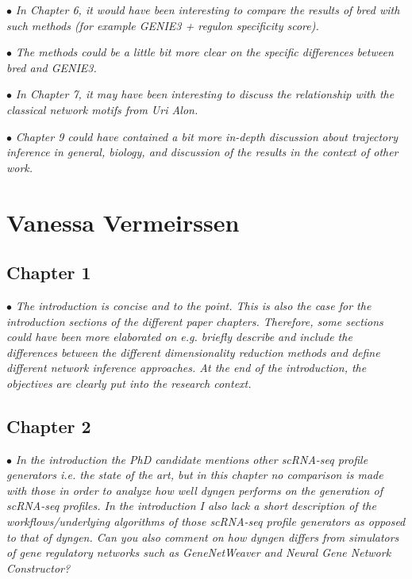 \documentclass[10pt]{article}
\newcommand{\exam}[2][\  ]{\hspace{0pt}\marginpar{\color{red}#1}$\bullet$ \textit{#2}}
\newcommand{\imp}[1]{{\color{red} #1}}
\newcommand{\nimp}[1]{{\color{gray} #1}}
\newcommand{\bigexclaim}{\raisebox{-0.1em}{\BigTriangleUp}\hspace{-0.32em}\llap{\small\textbf{!}}\hspace{0.32em}}
\newcommand{\tagimp}{\bigexclaim}
\newcommand{\tagtime}{{\Large $\hourglass$}}
\begin{document}
{{ 

\exam[\tagimp \tagtime]{\imp{In Chapter 6, it would have been interesting
to compare the results of bred with such methods (for example GENIE3 + regulon specificity score).}}

\exam[\tagimp \tagtime]{\imp{The methods could be a little bit more clear on the specific differences between bred and GENIE3.}}


\exam{In Chapter 7, it may have
been interesting to discuss the relationship with the classical network motifs from Uri Alon.}

\exam{Chapter 9 could have
contained a bit more in-depth discussion about trajectory inference in general, biology, and discussion
of the results in the context of other work.}

 


\section{Vanessa Vermeirssen}


\subsection{Chapter 1}

\exam{\nimp{The introduction is concise and to the point. This is also the case for the introduction sections of the
		different paper chapters. Therefore,} some sections could have been more elaborated on e.g. briefly
		describe and include the differences between the different dimensionality reduction methods and
		define different network inference approaches. \nimp{At the end of the introduction, the objectives are
		clearly put into the research context.}}

	

\subsection{Chapter 2}

\exam[\tagimp \tagtime]{In the introduction the PhD candidate mentions \imp{other scRNA-seq profile generators i.e. the
state of the art, but in this chapter no comparison is made with those in order to analyze how
well dyngen performs on the generation of scRNA-seq profiles.} In the introduction I also lack
a short description of the workflows/underlying algorithms of those scRNA-seq profile
generators as opposed to that of dyngen. Can you also comment on how dyngen differs from
simulators of gene regulatory networks such as GeneNetWeaver and Neural Gene Network
Constructor?}

}}
\end{document}
